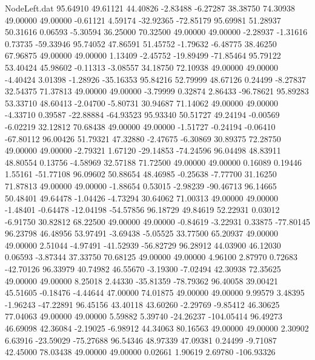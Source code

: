 \begin{filecontents}{NodeLeft.dat}
  95.64910   49.61121   44.40826    -2.83488   -6.27287   38.38750   74.30938   49.00000   49.00000   -0.61121    4.59174  -32.92365  -72.85179
  95.69981   51.28937   50.31616     0.06593   -5.30594   36.25000   70.32500   49.00000   49.00000   -2.28937   -1.31616    0.73735  -59.33946
  95.74052   47.86591   51.45752    -1.79632   -6.48775   38.46250   67.96875   49.00000   49.00000    1.13409   -2.45752  -19.89499  -71.85464
  95.79122   53.40424   45.98602    -0.11313   -3.08557   34.18750   72.10938   49.00000   49.00000   -4.40424    3.01398   -1.28926  -35.16353
  95.84216   52.79999   48.67126     0.24499   -8.27837   32.54375   71.37813   49.00000   49.00000   -3.79999    0.32874    2.86433  -96.78621
  95.89283   53.33710   48.60413    -2.04700   -5.80731   30.94687   71.14062   49.00000   49.00000   -4.33710    0.39587  -22.88884  -64.93523
  95.93340   50.51727   49.24194    -0.00569   -6.02219   32.12812   70.68438   49.00000   49.00000   -1.51727   -0.24194   -0.06410  -67.80112
  96.00426   51.79321   47.32880    -2.47675   -6.30869   30.89375   72.28750   49.00000   49.00000   -2.79321    1.67120  -29.14853  -74.24596
  96.04498   48.83911   48.80554     0.13756   -4.58969   32.57188   71.72500   49.00000   49.00000    0.16089    0.19446    1.55161  -51.77108
  96.09602   50.88654   48.46985    -0.25638   -7.77700   31.16250   71.87813   49.00000   49.00000   -1.88654    0.53015   -2.98239  -90.46713
  96.14665   50.48401   49.64478    -1.04426   -4.73294   30.64062   71.00313   49.00000   49.00000   -1.48401   -0.64478  -12.04198  -54.57856
  96.18729   49.84619   52.22931     0.03012   -6.91750   30.82812   68.22500   49.00000   49.00000   -0.84619   -3.22931    0.33875  -77.80145
  96.23798   46.48956   53.97491    -3.69438   -5.05525   33.77500   65.20937   49.00000   49.00000    2.51044   -4.97491  -41.52939  -56.82729
  96.28912   44.03900   46.12030     0.06593   -3.87344   37.33750   70.68125   49.00000   49.00000    4.96100    2.87970    0.72683  -42.70126
  96.33979   40.74982   46.55670    -3.19300   -7.02494   42.30938   72.35625   49.00000   49.00000    8.25018    2.44330  -35.81359  -78.79362
  96.40058   39.00421   45.51605    -0.18476   -4.44644   47.00000   74.01875   49.00000   49.00000    9.99579    3.48395   -1.96243  -47.22891
  96.45156   43.40118   43.60260    -2.29769   -9.85412   46.30625   77.04063   49.00000   49.00000    5.59882    5.39740  -24.26237 -104.05414
  96.49273   46.69098   42.36084    -2.19025   -6.98912   44.34063   80.16563   49.00000   49.00000    2.30902    6.63916  -23.59029  -75.27688
  96.54346   48.97339   47.09381     0.24499   -9.71087   42.45000   78.03438   49.00000   49.00000    0.02661    1.90619    2.69780 -106.93326

\end{filecontents}
